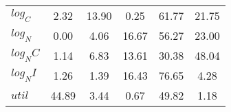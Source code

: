\begin{center}
\begin{longtable}{lccccc}
$log_C         $	 & 	        2.32	 & 	       13.90	 & 	        0.25	 & 	       61.77	 & 	       21.75 \\ 
$log_N         $	 & 	        0.00	 & 	        4.06	 & 	       16.67	 & 	       56.27	 & 	       23.00 \\ 
$log_NC        $	 & 	        1.14	 & 	        6.83	 & 	       13.61	 & 	       30.38	 & 	       48.04 \\ 
$log_NI        $	 & 	        1.26	 & 	        1.39	 & 	       16.43	 & 	       76.65	 & 	        4.28 \\ 
$util          $	 & 	       44.89	 & 	        3.44	 & 	        0.67	 & 	       49.82	 & 	        1.18 \\ 
\end{longtable}
 \end{center}
